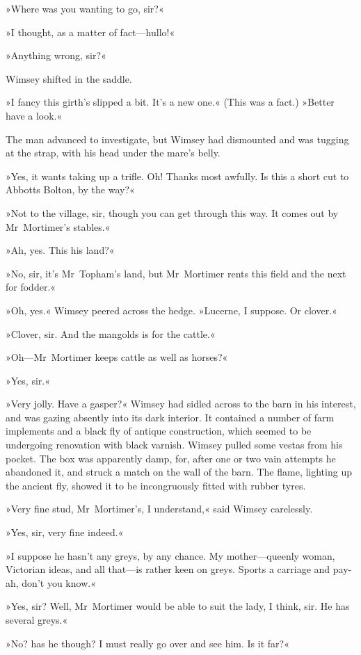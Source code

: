 »Where was you wanting to go, sir?«

»I thought, as a matter of fact—hullo!«

»Anything wrong, sir?«

Wimsey shifted in the saddle.

»I fancy this girth's slipped a bit. It's a new one.« (This was a fact.) »Better have a look.«

The man advanced to investigate, but Wimsey had dismounted and was tugging at the strap, with his head under the mare's belly.

»Yes, it wants taking up a trifle. Oh! Thanks most awfully. Is this a short cut to Abbotts Bolton, by the way?«

»Not to the village, sir, though you can get through this way. It comes out by Mr~Mortimer's stables.«

»Ah, yes. This his land?«

»No, sir, it's Mr~Topham's land, but Mr~Mortimer rents this field and the next for fodder.«

»Oh, yes.« Wimsey peered across the hedge. »Lucerne, I suppose. Or clover.«

»Clover, sir. And the mangolds is for the cattle.«

»Oh—Mr~Mortimer keeps cattle as well as horses?«

»Yes, sir.«

»Very jolly. Have a gasper?« Wimsey had sidled across to the barn in his interest, and was gazing absently into its dark interior. It contained a number of farm implements and a black fly of antique construction, which seemed to be undergoing renovation with black varnish. Wimsey pulled some vestas from his pocket. The box was apparently damp, for, after one or two vain attempts he abandoned it, and struck a match on the wall of the barn. The flame, lighting up the ancient fly, showed it to be incongruously fitted with rubber tyres.

»Very fine stud, Mr~Mortimer's, I understand,« said Wimsey carelessly.

»Yes, sir, very fine indeed.«

»I suppose he hasn't any greys, by any chance. My mother—queenly woman, Victorian ideas, and all that—is rather keen on greys. Sports a carriage and pay-ah, don't you know.«

»Yes, sir? Well, Mr~Mortimer would be able to suit the lady, I think, sir. He has several greys.«

»No? has he though? I must really go over and see him. Is it far?«

